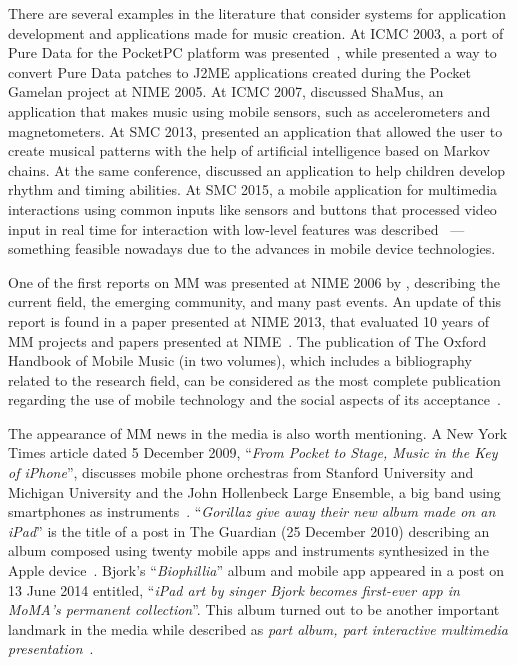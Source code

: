 There are several examples in the literature that consider systems for application development and applications made for music creation.
At ICMC 2003, a port of Pure Data for the PocketPC platform was presented~\citep{Geiger2003pda}, while
\cite{Schiemer2005pocketgamelan} presented a way to convert Pure Data patches to J2ME applications created during the Pocket Gamelan project at NIME 2005.
At ICMC 2007, \cite{Essl2007shamus} discussed ShaMus, an application that makes music using mobile sensors, such as accelerometers and magnetometers.
At SMC 2013, \cite{Ekeus2013predictable} presented an application that allowed the user to create musical patterns with the help of artificial intelligence based on Markov chains.
At the same conference, \cite{Baldan2013melody} discussed an application to help children develop rhythm and timing abilities.
At SMC 2015, a mobile application for multimedia interactions using common inputs like sensors and buttons that processed video input in real time for interaction with low-level features was described~\citep{Krekovic2015sound} --- something feasible nowadays due to the advances in mobile device technologies.

One of the first reports on MM was presented at NIME 2006 by \cite{Gaye2006report}, describing the current field, the emerging community, and many past events.
An update of this report is found in a paper presented at NIME 2013, that evaluated 10 years of MM projects and papers presented at NIME~\citep{John2013updating}.
The publication of The Oxford Handbook of Mobile Music (in two volumes), which includes a bibliography related to the research field, can be considered as the most complete publication regarding the use of mobile technology and the social aspects of its acceptance~\citep{Gopinath2014handbookmobilemusicstudies1,Gopinath2014handbookmobilemusicstudies2}.

The appearance of MM news in the media is also worth mentioning.
A New York Times article dated 5 December 2009, ``\textit{From Pocket to Stage, Music in the Key of iPhone}'', discusses mobile phone orchestras from Stanford University and Michigan University and the John Hollenbeck Large Ensemble, a big band using smartphones as instruments~\citep{Miller2009nytimes}.
``\textit{Gorillaz give away their new album made on an iPad}'' is the title of a post in The Guardian (25 December 2010) describing an album composed using twenty mobile apps and instruments synthesized in the Apple device~\citep{Smith2010gorillaz}.
Bjork's ``\textit{Biophillia}'' album and mobile app appeared in a post on 13 June 2014 entitled, ``\textit{iPad art by singer Bjork becomes first-ever app in MoMA's permanent collection}''.
This album turned out to be another important landmark in the media while described as \textit{part album, part interactive multimedia presentation}~\citep{Hughes2014bjork}.


